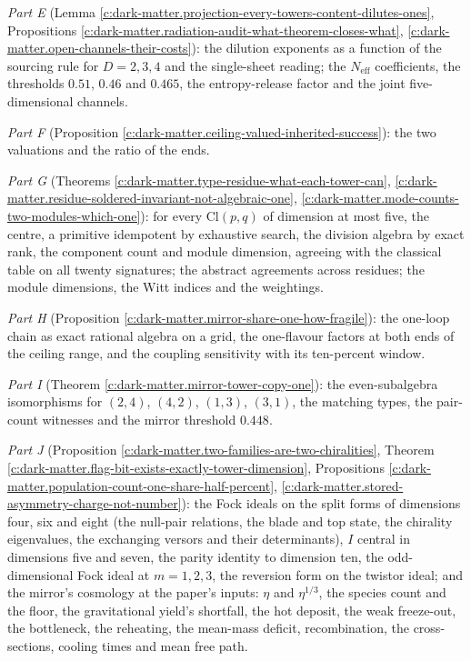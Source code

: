 \documentclass[11pt]{article}
\theoremstyle{definition}
\theoremstyle{plain}
\providecommand{\Cl}{}\renewcommand{\Cl}{\mathrm{Cl}}
\providecommand{\Neff}{}\renewcommand{\Neff}{N_{\mathrm{eff}}}
\begin{document}
\emph{Part E} (Lemma \ref{c:dark-matter.projection-every-towers-content-dilutes-ones}, Propositions \ref{c:dark-matter.radiation-audit-what-theorem-closes-what}, \ref{c:dark-matter.open-channels-their-costs}): the dilution exponents as a function of the sourcing rule for $D = 2, 3, 4$ and the single-sheet reading; the $\Neff$ coefficients, the thresholds $0.51$, $0.46$ and $0.465$, the entropy-release factor and the joint five-dimensional channels.

\emph{Part F} (Proposition \ref{c:dark-matter.ceiling-valued-inherited-success}): the two valuations and the ratio of the ends.

\emph{Part G} (Theorems \ref{c:dark-matter.type-residue-what-each-tower-can}, \ref{c:dark-matter.residue-soldered-invariant-not-algebraic-one}, \ref{c:dark-matter.mode-counts-two-modules-which-one}): for every $\Cl(p,q)$ of dimension at most five, the centre, a primitive idempotent by exhaustive search, the division algebra by exact rank, the component count and module dimension, agreeing with the classical table on all twenty signatures; the abstract agreements across residues; the module dimensions, the Witt indices and the weightings.

\emph{Part H} (Proposition \ref{c:dark-matter.mirror-share-one-how-fragile}): the one-loop chain as exact rational algebra on a grid, the one-flavour factors at both ends of the ceiling range, and the coupling sensitivity with its ten-percent window.

\emph{Part I} (Theorem \ref{c:dark-matter.mirror-tower-copy-one}): the even-subalgebra isomorphisms for $(2,4)$, $(4,2)$, $(1,3)$, $(3,1)$, the matching types, the pair-count witnesses and the mirror threshold $0.448$.

\emph{Part J} (Proposition \ref{c:dark-matter.two-families-are-two-chiralities}, Theorem \ref{c:dark-matter.flag-bit-exists-exactly-tower-dimension}, Propositions \ref{c:dark-matter.population-count-one-share-half-percent}, \ref{c:dark-matter.stored-asymmetry-charge-not-number}): the Fock ideals on the split forms of dimensions four, six and eight (the null-pair relations, the blade and top state, the chirality eigenvalues, the exchanging versors and their determinants), $I$ central in dimensions five and seven, the parity identity to dimension ten, the odd-dimensional Fock ideal at $m = 1, 2, 3$, the reversion form on the twistor ideal; and the mirror's cosmology at the paper's inputs: $\eta$ and $\eta^{1/3}$, the species count and the floor, the gravitational yield's shortfall, the hot deposit, the weak freeze-out, the bottleneck, the reheating, the mean-mass deficit, recombination, the cross-sections, cooling times and mean free path.
\end{document}
